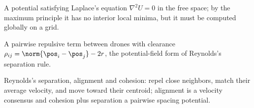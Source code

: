 \item[Harmonic potential] A potential satisfying Laplace's equation $\nabla^2U=0$ in the free space; by the maximum principle it has no interior local minima, but it must be computed globally on a grid.
\item[Inter-agent repulsion] A pairwise repulsive term between drones with clearance $\rho_{ij}=\norm{\pos_i-\pos_j}-2r$, the potential-field form of Reynolds's separation rule.
\item[Flocking rules] Reynolds's separation, alignment and cohesion: repel close neighbors, match their average velocity, and move toward their centroid; alignment is a velocity consensus and cohesion plus separation a pairwise spacing potential.
